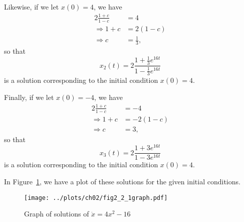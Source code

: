 Likewise, if we let $x(0) = 4$, we have
\begin{equation*}
    \begin{split}
        2\frac{1 + c}{1 - c} &= 4 \\
        \Rightarrow 1 + c &= 2(1 - c) \\
        \Rightarrow c &= \frac{1}{3},
    \end{split}
\end{equation*}
so that 
\[
    x_2(t) = 2\frac{1 + \frac{1}{3}e^{16t}}{1 - \frac{1}{3}e^{16t}}
\]
is a solution corresponding to the initial condition $x(0) = 4$.

Finally, if we let $x(0) = -4$, we have
\begin{equation*}
    \begin{split}
        2\frac{1 + c}{1 - c} &= -4 \\
        \Rightarrow 1 + c &= -2(1 - c) \\
        \Rightarrow c &= 3,
    \end{split}
\end{equation*}
so that 
\[
    x_3(t) = 2\frac{1 + 3e^{16t}}{1 - 3e^{16t}}
\]
is a solution corresponding to the initial condition $x(0) = 4$.

In Figure~\ref{fig2_2_1graph}, we have a plot of these solutions for the given 
initial conditions.
\begin{figure}[!ht]
    \texttt{[image: ../plots/ch02/fig2\_2\_1graph.pdf]}
    \caption{Graph of solutions of $\dot{x} = 4x^2 - 16$\label{fig2_2_1graph}}
\end{figure}
